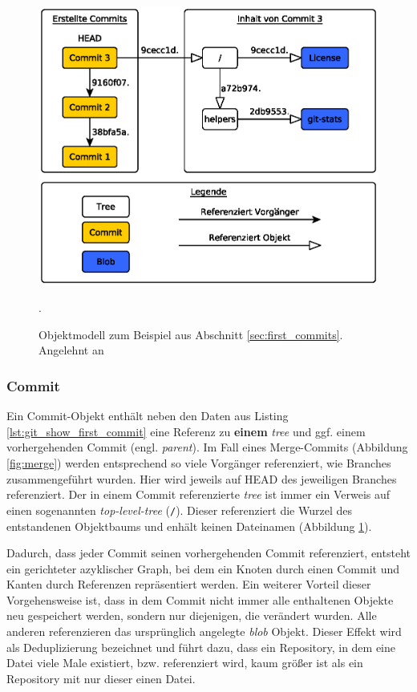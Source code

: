 
\begin{figure}[h]
  \centering
  \includegraphics[scale=0.75]{images/objectmodel.eps}
  \caption{Objektmodell zum Beispiel aus Abschnitt \ref{sec:first_commits}.
  Angelehnt an \cite[S.~53]{gitosp}}.
  \label{fig:objectmodel}
\end{figure}

\subsubsection{Commit}\label{sec:commitobject}
Ein Commit-Objekt enthält neben den Daten aus Listing
\ref{lst:git_show_first_commit} eine Referenz zu \textbf{einem} \textit{tree}
und ggf. einem vorhergehenden Commit (engl. \textit{parent}). Im Fall eines
Merge-Commits (Abbildung \ref{fig:merge}) werden entsprechend so viele
Vorgänger referenziert, wie Branches zusammengeführt wurden. Hier wird jeweils
auf \gls{HEAD} des jeweiligen Branches referenziert. Der in einem Commit
referenzierte \textit{tree} ist immer ein Verweis auf einen sogenannten
\textit{top-level-tree} (\texttt{/}). Dieser referenziert die Wurzel des
entstandenen Objektbaums und enhält keinen Dateinamen (Abbildung
\ref{fig:objectmodel}).

Dadurch, dass jeder Commit seinen vorhergehenden Commit referenziert, entsteht ein
gerichteter azyklischer Graph, bei dem ein Knoten durch einen Commit und Kanten
durch Referenzen repräsentiert werden. Ein weiterer Vorteil dieser
Vorgehensweise ist, dass in dem Commit nicht immer alle enthaltenen Objekte neu
gespeichert werden, sondern nur diejenigen, die verändert wurden. Alle anderen
referenzieren das ursprünglich angelegte \textit{blob} Objekt. Dieser Effekt
wird als Deduplizierung bezeichnet und führt dazu, dass ein Repository, in dem
eine Datei viele Male existiert, bzw. referenziert wird, kaum größer ist als ein
Repository mit nur dieser einen Datei. \cite[56-57]{gitosp}

